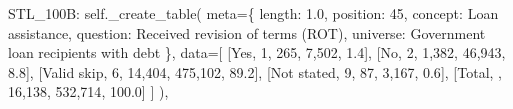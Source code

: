 \documentclass[
  11pt,
  a4paper,
]{article}
\newenvironment{Shaded}{\begin{snugshade}}{\end{snugshade}}
\newcommand{\NormalTok}[1]{\textcolor[rgb]{0.00,0.23,0.31}{#1}}
\newcommand{\OperatorTok}[1]{\textcolor[rgb]{0.37,0.37,0.37}{#1}}
\newcommand{\StringTok}[1]{\textcolor[rgb]{0.13,0.47,0.30}{#1}}
\newcommand{\VariableTok}[1]{\textcolor[rgb]{0.07,0.07,0.07}{#1}}
\begin{document}
\begin{Shaded}
\begin{Highlighting}[]
            \StringTok{\textquotesingle{}STL\_100B\textquotesingle{}}\NormalTok{: }\VariableTok{self}\NormalTok{.\_create\_table(}
\NormalTok{                meta}\OperatorTok{=}\NormalTok{\{}
                \StringTok{\textquotesingle{}length\textquotesingle{}}\NormalTok{: }\StringTok{\textquotesingle{}1.0\textquotesingle{}}\NormalTok{, }\StringTok{\textquotesingle{}position\textquotesingle{}}\NormalTok{: }\StringTok{\textquotesingle{}45\textquotesingle{}}\NormalTok{,}
                \StringTok{\textquotesingle{}concept\textquotesingle{}}\NormalTok{: }\StringTok{\textquotesingle{}Loan assistance\textquotesingle{}}\NormalTok{,}
                \StringTok{\textquotesingle{}question\textquotesingle{}}\NormalTok{: }\StringTok{\textquotesingle{}Received revision of terms (ROT)\textquotesingle{}}\NormalTok{,}
                \StringTok{\textquotesingle{}universe\textquotesingle{}}\NormalTok{: }\StringTok{\textquotesingle{}Government loan recipients with debt\textquotesingle{}}
\NormalTok{                \},}
\NormalTok{                data}\OperatorTok{=}\NormalTok{[}
\NormalTok{                [}\StringTok{\textquotesingle{}Yes\textquotesingle{}}\NormalTok{, }\StringTok{\textquotesingle{}1\textquotesingle{}}\NormalTok{, }\StringTok{\textquotesingle{}265\textquotesingle{}}\NormalTok{, }\StringTok{\textquotesingle{}7,502\textquotesingle{}}\NormalTok{, }\StringTok{\textquotesingle{}1.4\textquotesingle{}}\NormalTok{],}
\NormalTok{                [}\StringTok{\textquotesingle{}No\textquotesingle{}}\NormalTok{, }\StringTok{\textquotesingle{}2\textquotesingle{}}\NormalTok{, }\StringTok{\textquotesingle{}1,382\textquotesingle{}}\NormalTok{, }\StringTok{\textquotesingle{}46,943\textquotesingle{}}\NormalTok{, }\StringTok{\textquotesingle{}8.8\textquotesingle{}}\NormalTok{],}
\NormalTok{                [}\StringTok{\textquotesingle{}Valid skip\textquotesingle{}}\NormalTok{, }\StringTok{\textquotesingle{}6\textquotesingle{}}\NormalTok{, }\StringTok{\textquotesingle{}14,404\textquotesingle{}}\NormalTok{, }\StringTok{\textquotesingle{}475,102\textquotesingle{}}\NormalTok{, }\StringTok{\textquotesingle{}89.2\textquotesingle{}}\NormalTok{],}
\NormalTok{                [}\StringTok{\textquotesingle{}Not stated\textquotesingle{}}\NormalTok{, }\StringTok{\textquotesingle{}9\textquotesingle{}}\NormalTok{, }\StringTok{\textquotesingle{}87\textquotesingle{}}\NormalTok{, }\StringTok{\textquotesingle{}3,167\textquotesingle{}}\NormalTok{, }\StringTok{\textquotesingle{}0.6\textquotesingle{}}\NormalTok{],}
\NormalTok{                [}\StringTok{\textquotesingle{}Total\textquotesingle{}}\NormalTok{, }\StringTok{\textquotesingle{}\textquotesingle{}}\NormalTok{, }\StringTok{\textquotesingle{}16,138\textquotesingle{}}\NormalTok{, }\StringTok{\textquotesingle{}532,714\textquotesingle{}}\NormalTok{, }\StringTok{\textquotesingle{}100.0\textquotesingle{}}\NormalTok{]}
\NormalTok{                ]}
\NormalTok{            ),}
        

\end{Highlighting}
\end{Shaded}
\end{document}
